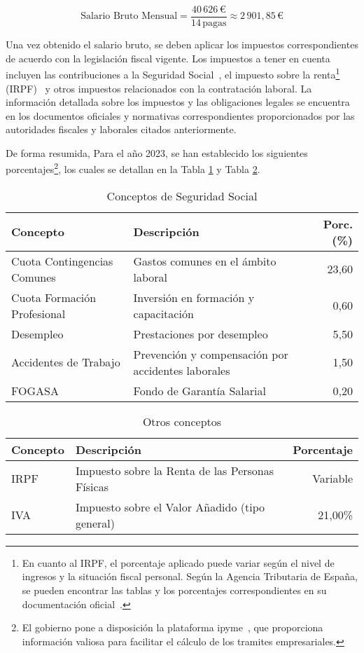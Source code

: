 \begin{enumerate}
\begin{enumerate}
        \[\text{{Salario Bruto Mensual}} = \frac{{40\,626 \,\text{{€}}}}{{14 \, \text{{pagas}}}} \approx 2\,901,85  \,\text{{€}}\]
        
    \end{enumerate}
    
    Una vez obtenido el salario bruto, se deben aplicar los impuestos correspondientes de acuerdo con la legislación fiscal vigente. Los impuestos a tener en cuenta incluyen las contribuciones a la Seguridad Social~\cite{Cotización}, el impuesto sobre la renta\footnote{En cuanto al IRPF, el porcentaje aplicado puede variar según el nivel de ingresos y la situación fiscal personal. Según la Agencia Tributaria de España, se pueden encontrar las tablas y los porcentajes correspondientes en su documentación oficial~\cite{AEAT}.} (IRPF)~\cite{IRPF} y otros impuestos relacionados con la contratación laboral. La información detallada sobre los impuestos y las obligaciones legales se encuentra en los documentos oficiales y normativas correspondientes proporcionados por las autoridades fiscales y laborales citados anteriormente. 
    
    
    De forma resumida, Para el año 2023, se han establecido los siguientes porcentajes\footnote{El gobierno pone a disposición la plataforma ipyme~\cite{ipyme}, que proporciona información valiosa para facilitar el cálculo de los tramites empresariales.}, los cuales se detallan en la Tabla \ref{tab:seguridad-social} y Tabla \ref{tab:no-seguridad-social}.

\begin{table}[h]
\centering
\begin{tabularx}{320}{@{}XXr@{}}
\toprule
\textbf{Concepto} & \textbf{Descripción} & \textbf{Porc. (\%)} \\
\midrule
Cuota Contingencias Comunes & Gastos comunes en el ámbito laboral & 23,60 \\
Cuota Formación Profesional & Inversión en formación y capacitación & 0,60 \\
Desempleo & Prestaciones por desempleo & 5,50 \\
Accidentes de Trabajo & Prevención y compensación por accidentes laborales & 1,50 \\
FOGASA & Fondo de Garantía Salarial & 0,20 \\
\bottomrule
\end{tabularx}
\caption{Conceptos de Seguridad Social}
\label{tab:seguridad-social}
\end{table}

\begin{table}[h]
\centering
\begin{tabularx}{320}{@{}XXr@{}}
\toprule
\textbf{Concepto} & \textbf{Descripción} & \textbf{Porcentaje} \\
\midrule
IRPF & Impuesto sobre la Renta de las Personas Físicas & Variable\\
IVA & Impuesto sobre el Valor Añadido (tipo general) & 21,00\% \\
\bottomrule
\end{tabularx}
\caption{Otros conceptos}
\label{tab:no-seguridad-social}
\end{table}


\end{enumerate}
